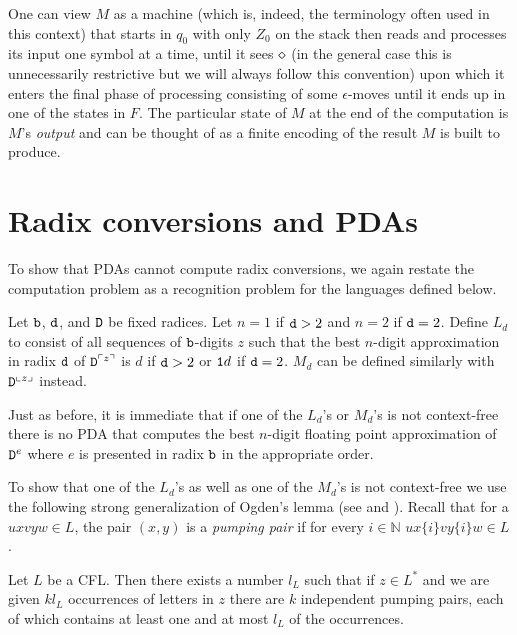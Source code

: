 \documentclass[12pt]{article}
\begin{document}
One can view $M$ as a machine (which is, indeed, the terminology often
used in this context) that starts in $q_0$ with only $Z_0$ on the
stack then reads and processes its input one
symbol at a time, until it sees $\diamond$ (in the general case this is
unnecessarily restrictive but we will always follow this convention) upon
which it enters the final phase of processing consisting of some
$\epsilon$-moves until it ends up in one of the states in $F$. The
particular state of $M$ at the end of the computation is $M$'s {\it
output\/} and can be thought of as a finite encoding of the result $M$
is built to produce.

\iffalse
Following the established tradition, we also use $\{\theta\}$ to
denote the fractional part of $\theta$
(i.e.~$\{\theta\}=\theta\bmod1$). This should not cause any confusion
with the use of $d\{k\}$ as a regular expression for a string of
$d$'s. Note that $\{x+y\}$ is continuous at
every $(x,y)$ such that $(x+y)\bmod 1\not=0$.
\fi

\section{Radix conversions and PDAs}

To show that PDAs cannot compute radix conversions, we again restate
the computation problem as a recognition problem for the languages
defined below.
\begin{definition}Let ${\tt b}$, ${\tt d}$, and ${\tt D}$ be fixed radices. Let
  $n=1$ if ${\tt d}>2$ and $n=2$ if ${\tt d}=2$. Define $L_d$
  to consist of all sequences of ${\tt b}$-digits $z$ such that the best $n$-digit
  approximation in radix ${\tt d}$ of ${\tt D}^{\ulcorner z\urcorner}$ is
  $d$ if ${\tt d}>2$ or ${\tt 1}d$ if ${\tt d}=2$. $M_d$ can be defined similarly with ${\tt D}^{\llcorner
    z\lrcorner}$ instead.
\end{definition}
Just as before, it is immediate that if one of the $L_d$'s or $M_d$'s
is not context-free there is no PDA that computes the best $n$-digit
floating point approximation of ${\tt D}^e$ where $e$ is presented in
radix ${\tt b}$ in the appropriate order.

\iffalse To show that one of the $L_d$'s as well as one of the $M_d$'s is not
context-free we use the following strong generalization of Ogden's lemma
(see \cite{hum} and \cite{Kracht}). Recall that for a $uxvyw\in L$, the pair $(x,y)$ is
a {\it pumping pair\/} if for every $i\in{\mathbb N}$ $ux\{i\}vy\{i\}w\in L$.

\begin{theorem}\label{inpum}
Let $L$ be a CFL. Then there exists a number $l_L$ such that if $z\in
L^*$ and we are given $kl_L$ occurrences of letters in $z$ there are
$k$ independent pumping pairs, each of which contains at least one and
at most $l_L$ of the occurrences.
\end{theorem}
\end{document}
